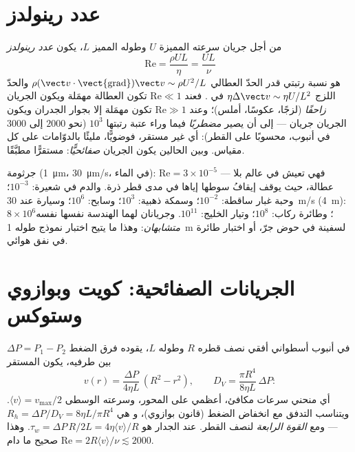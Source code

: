 \section{عدد رينولدز}

\begin{definition}\label{def:b2:viscous-flows:reynolds}
من أجل جريان سرعته المميزة $U$ وطوله المميز $L$، يكون \emph{عدد
رينولدز}
\[
\mathrm{Re} = \frac{\rho UL}{\eta} = \frac{UL}{\nu}
\]
هو نسبة رتبتي قدر الحدّ العطالي
$\rho(\vect v\cdot\operatorname{\vect{grad}})\vect v \sim \rho U^2/L$ والحدّ
اللزج $\eta\Delta\vect v \sim \eta U/L^2$ في .
فعند $\mathrm{Re} \ll 1$ تكون العطالة مهمَلة ويكون الجريان
\emph{زاحفًا} (لزجًا، عكوسًا، أملس)؛ وعند $\mathrm{Re} \gg 1$
تكون  مهمَلة إلا بجوار الجدران ويكون الجريان جريان
 --- إلى أن يصير \emph{مضطربًا} فيما وراء عتبة رتبتها $10^3$
(نحو $2000$ إلى $3000$ في أنبوب، محسوبًا على القطر):
أي غير مستقر، فوضويًّا، مليئًا بالدوّامات على كل مقياس. وبين
الحالين يكون الجريان \emph{صفائحيًّا}: مستقرًّا مطبَّقًا.
\end{definition}

\begin{example}\label{ex:b2:viscous-flows:revalues}
جرثومة (\qty{1}{\micro m}، \qty{30}{\micro m/s}، في الماء): $\mathrm{Re} =
3 \times 10^{-5}$ --- فهي تعيش في عالم بلا عطالة، حيث يوقف إيقافُ
سوطها إياها في مدى قطر ذرة. والدم في شعيرة:
$10^{-3}$؛ وحبة غبار ساقطة: $10^{-2}$؛ وسمكة ذهبية: $10^3$؛ وسابح:
$10^6$؛ وسيارة عند \qty{30}{m/s} (\qty{4}{m}): $8 \times 10^6$؛ وطائرة ركاب: $10^8$؛
وتيار الخليج: $10^{11}$. وجريانان لهما الهندسة نفسها  نفسه \emph{متشابهان}: وهذا ما يتيح اختبار نموذج طوله \qty{1}{m}
لسفينة في حوض جرّ، أو اختبار طائرة في نفق هوائي.
\end{example}

\section{الجريانات الصفائحية: كويت وبوازوي وستوكس}

\begin{proposition}\label{prop:b2:viscous-flows:poiseuille}
في أنبوب أسطواني أفقي نصف قطره $R$ وطوله $L$، يقوده فرق الضغط
$\Delta P = P_1 - P_2$ بين طرفيه، يكون  المستقر
\[
v(r) = \frac{\Delta P}{4\eta L}\,(R^2 - r^2) , \qquad
D_V = \frac{\pi R^4}{8\eta L}\,\Delta P :
\]
أي منحني سرعات مكافئ، أعظمي على المحور، وسرعته الوسطى
$\langle v\rangle = v_{\max}/2$. ويتناسب التدفق مع انخفاض
الضغط (قانون بوازوي)، و\emph{} هي
$R_h = \Delta P/D_V = 8\eta L/\pi R^4$ --- ومع \emph{القوة الرابعة}
لنصف القطر.  عند الجدار هو $\tau_w = \Delta P\,R/2L = 4\eta\langle v
\rangle/R$. وهذا صحيح ما دام $\mathrm{Re} = 2R\langle v\rangle/\nu \lesssim 2000$.
\end{proposition}

